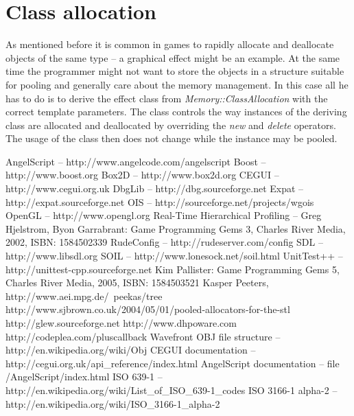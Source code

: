 \documentclass[a4paper, 12pt]{report}
\begin{document}
\section{Class allocation}
As mentioned before it is common in games to rapidly allocate and deallocate objects of the same type -- a graphical effect might be an example. At the same time the programmer might not want to store the objects in a structure suitable for pooling and generally care about the memory management. In this case all he has to do is to derive the effect class from \emph{Memory::ClassAllocation} with the correct template parameters. The class controls the way instances of the deriving class are allocated and deallocated by overriding the \emph{new} and \emph{delete} operators. The usage of the class then does not change while the instance may be pooled.


\begin{thebibliography}{9}
AngelScript -- http://www.angelcode.com/angelscript
Boost -- http://www.boost.org
Box2D -- http://www.box2d.org
CEGUI -- http://www.cegui.org.uk
DbgLib -- http://dbg.sourceforge.net
Expat -- http://expat.sourceforge.net
OIS -- http://sourceforge.net/projects/wgois
OpenGL -- http://www.opengl.org
Real-Time Hierarchical Profiling -- Greg Hjelstrom, Byon Garrabrant: Game Programming Gems 3, Charles River Media, 2002, ISBN: 1584502339
RudeConfig -- http://rudeserver.com/config
SDL -- http://www.libsdl.org
SOIL -- http://www.lonesock.net/soil.html
UnitTest++ -- http://unittest-cpp.sourceforge.net
Kim Pallister: Game Programming Gems 5, Charles River Media, 2005, ISBN: 1584503521
Kasper Peeters, http://www.aei.mpg.de/~peekas/tree
http://www.sjbrown.co.uk/2004/05/01/pooled-allocators-for-the-stl
http://glew.sourceforge.net
http://www.dhpoware.com
http://codeplea.com/pluscallback
Wavefront OBJ file structure -- http://en.wikipedia.org/wiki/Obj
CEGUI documentation -- http://cegui.org.uk/api\_reference/index.html
AngelScript documentation -- file /AngelScript/index.html
ISO 639-1 -- http://en.wikipedia.org/wiki/List\_of\_ISO\_639-1\_codes
ISO 3166-1 alpha-2 -- http://en.wikipedia.org/wiki/ISO\_3166-1\_alpha-2
\end{thebibliography}

\clearpage
{}
\listoffigures

\clearpage
{}
\listoftables
\end{document}

